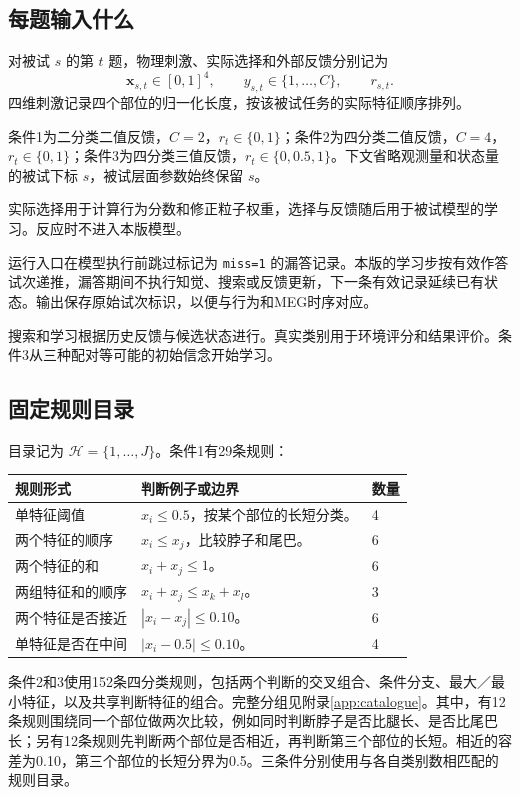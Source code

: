 \documentclass[12pt]{article}
\begin{document}
\subsection{每题输入什么}

对被试 $s$ 的第 $t$ 题，物理刺激、实际选择和外部反馈分别记为
\begin{equation}
\bm x_{s,t}\in[0,1]^4,\qquad
y_{s,t}\in\{1,\ldots,C\},\qquad r_{s,t}.
\end{equation}
四维刺激记录四个部位的归一化长度，按该被试任务的实际特征顺序排列。

条件1为二分类二值反馈，$C=2$，$r_t\in\{0,1\}$；条件2为四分类二值反馈，$C=4$，$r_t\in\{0,1\}$；条件3为四分类三值反馈，$r_t\in\{0,0.5,1\}$。下文省略观测量和状态量的被试下标 $s$，被试层面参数始终保留 $s$。

实际选择用于计算行为分数和修正粒子权重，选择与反馈随后用于被试模型的学习。反应时不进入本版模型。

运行入口在模型执行前跳过标记为 \texttt{miss=1} 的漏答记录。本版的学习步按有效作答试次递推，漏答期间不执行知觉、搜索或反馈更新，下一条有效记录延续已有状态。输出保存原始试次标识，以便与行为和MEG时序对应。

搜索和学习根据历史反馈与候选状态进行。真实类别用于环境评分和结果评价。条件3从三种配对等可能的初始信念开始学习。

\subsection{固定规则目录}

目录记为 $\mathcal H=\{1,\ldots,J\}$。条件1有29条规则：

{\small
\begin{longtable}{L{3.7cm}L{8.6cm}L{1.3cm}}
\toprule
规则形式 & 判断例子或边界 & 数量\\
\midrule
\endhead
单特征阈值 & $x_i\leq0.5$，按某个部位的长短分类。 & 4\\
两个特征的顺序 & $x_i\leq x_j$，比较脖子和尾巴。 & 6\\
两个特征的和 & $x_i+x_j\leq1$。 & 6\\
两组特征和的顺序 & $x_i+x_j\leq x_k+x_l$。 & 3\\
两个特征是否接近 & $|x_i-x_j|\leq0.10$。 & 6\\
单特征是否在中间 & $|x_i-0.5|\leq0.10$。 & 4\\
\bottomrule
\end{longtable}
}

条件2和3使用152条四分类规则，包括两个判断的交叉组合、条件分支、最大／最小特征，以及共享判断特征的组合。完整分组见附录\ref{app:catalogue}。其中，有12条规则围绕同一个部位做两次比较，例如同时判断脖子是否比腿长、是否比尾巴长；另有12条规则先判断两个部位是否相近，再判断第三个部位的长短。相近的容差为0.10，第三个部位的长短分界为0.5。三条件分别使用与各自类别数相匹配的规则目录。
\end{document}
